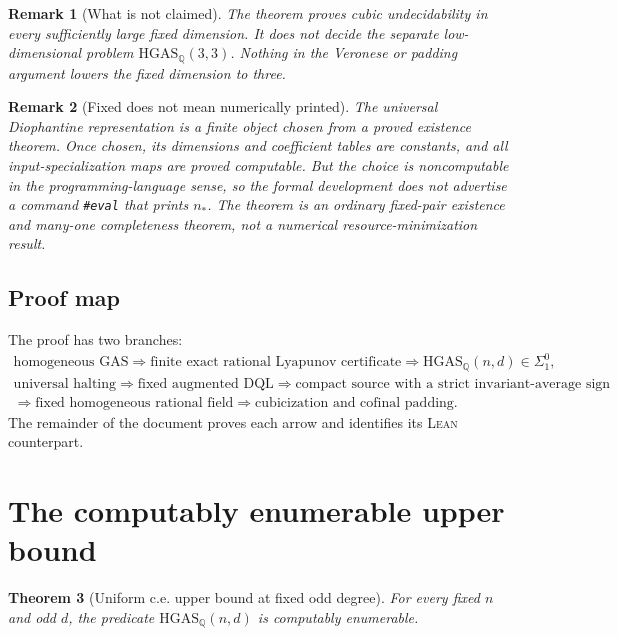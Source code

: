 \documentclass[11pt]{article}
\newtheorem{theorem}{Theorem}[section]
\newtheorem{remark}[theorem]{Remark}
\newcommand{\Q}{\mathbb Q}
\newcommand{\HGAS}{\mathrm{HGAS}}
\newcommand{\Lean}{\textsc{Lean}}
\begin{document}
\begin{remark}[What is not claimed]
The theorem proves cubic undecidability in every sufficiently large fixed
dimension.  It does \emph{not} decide the separate low-dimensional problem
\(\HGAS_{\Q}(3,3)\).  Nothing in the Veronese or padding argument lowers
the fixed dimension to three.
\end{remark}

\begin{remark}[Fixed does not mean numerically printed]
The universal Diophantine representation is a finite object chosen from a
proved existence theorem.  Once chosen, its dimensions and coefficient
tables are constants, and all input-specialization maps are proved
computable.  But the choice is noncomputable in the programming-language
sense, so the formal development does not advertise a command
\texttt{\#eval} that prints \(n_\ast\).  The theorem is an ordinary fixed-pair
existence and many-one completeness theorem, not a numerical
resource-minimization result.
\end{remark}

\subsection{Proof map}

The proof has two branches:
\[
\begin{array}{c}
\text{homogeneous GAS}
 \Longrightarrow
\text{finite exact rational Lyapunov certificate}
 \Longrightarrow
\HGAS_{\Q}(n,d)\in\Sigma^0_1,
\\[5pt]
\text{universal halting}
\Longrightarrow
\text{fixed augmented DQL}
\Longrightarrow
\text{compact source with a strict invariant-average sign}
\\
\Longrightarrow
\text{fixed homogeneous rational field}
\Longrightarrow
\text{cubicization and cofinal padding}.
\end{array}
\tag{1.5}
\]
The remainder of the document proves each arrow and identifies its
\Lean{} counterpart.

\section{The computably enumerable upper bound}
\label{sec:upper}

\begin{theorem}[Uniform c.e. upper bound at fixed odd degree]
\label{thm:upper}
For every fixed \(n\) and odd \(d\), the predicate
\(\HGAS_{\Q}(n,d)\) is computably enumerable.
\end{theorem}
\end{document}
